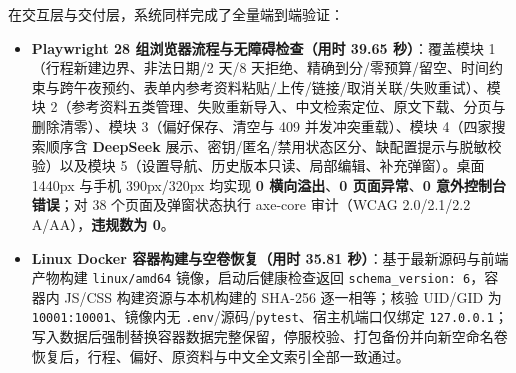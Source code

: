 在交互层与交付层，系统同样完成了全量端到端验证：
\begin{itemize}
  \item \textbf{Playwright 28 组浏览器流程与无障碍检查（用时 39.65 秒）}：覆盖模块 1（行程新建边界、非法日期/2 天/8 天拒绝、精确到分/零预算/留空、时间约束与跨午夜预约、表单内参考资料粘贴/上传/链接/取消关联/失败重试）、模块 2（参考资料五类管理、失败重新导入、中文检索定位、原文下载、分页与删除清零）、模块 3（偏好保存、清空与 409 并发冲突重载）、模块 4（四家搜索顺序含 \textbf{DeepSeek} 展示、密钥/匿名/禁用状态区分、缺配置提示与脱敏校验）以及模块 5（设置导航、历史版本只读、局部编辑、补充弹窗）。桌面 1440px 与手机 390px/320px 均实现 \textbf{0 横向溢出}、\textbf{0 页面异常}、\textbf{0 意外控制台错误}；对 38 个页面及弹窗状态执行 axe-core 审计（WCAG 2.0/2.1/2.2 A/AA），\textbf{违规数为 0}。
  \item \textbf{Linux Docker 容器构建与空卷恢复（用时 35.81 秒）}：基于最新源码与前端产物构建 \texttt{linux/amd64} 镜像，启动后健康检查返回 \texttt{schema\_version: 6}，容器内 JS/CSS 构建资源与本机构建的 SHA-256 逐一相等；核验 UID/GID 为 \texttt{10001:10001}、镜像内无 \texttt{.env}/源码/\texttt{pytest}、宿主机端口仅绑定 \texttt{127.0.0.1}；写入数据后强制替换容器数据完整保留，停服校验、打包备份并向新空命名卷恢复后，行程、偏好、原资料与中文全文索引全部一致通过。
\end{itemize}
